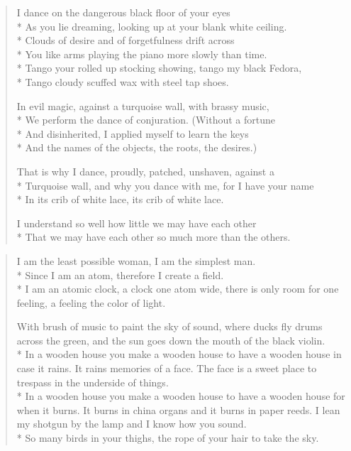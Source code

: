 \documentclass[english,11pt,letterpaper,onecolumn]{scrbook}
\begin{document}
\begin{verse}
I dance on the dangerous black floor of your eyes \\*
As you lie dreaming, looking up at your blank white ceiling. \\*
Clouds of desire and of forgetfulness drift across \\*
You like arms playing the piano more slowly than time. \\*
Tango your rolled up stocking showing, tango my black Fedora, \\*
Tango cloudy scuffed wax with steel tap shoes.



In evil magic, against a turquoise wall, with brassy music, \\*
We perform the dance of conjuration.  (Without a fortune \\*
And disinherited, I applied myself to learn the keys \\*
And the names of the objects, the roots, the desires.)



That is why I dance, proudly, patched, unshaven, against a \\*
Turquoise wall, and why you dance with me, for I have your name \\*
In its crib of white lace, its crib of white lace.



I understand so well how little we may have each other \\*
That we may have each other so much more than the others.

\end{verse}

\newpage
{}

\begin{verse}

I am the least possible woman, I am the simplest man. \\*
Since I am an atom, therefore I create a field. \\*
I am an atomic clock, a clock one atom wide, there is only room for one feeling, a feeling the color of light.



With brush of music to paint the sky of sound, where ducks fly drums across the green, and the sun goes down the mouth of the black violin. \\*
In a wooden house you make a wooden house to have a wooden house in case it rains.  It rains memories of a face.  The face is a sweet place to trespass in the underside of things. \\*
In a wooden house you make a wooden house to have a wooden house for when it burns.  It burns in china organs and it burns in paper reeds.  I lean my shotgun by the lamp and I know how you sound. \\*
So many birds in your thighs, the rope of your hair to take the sky.

\end{verse}
\end{document}
